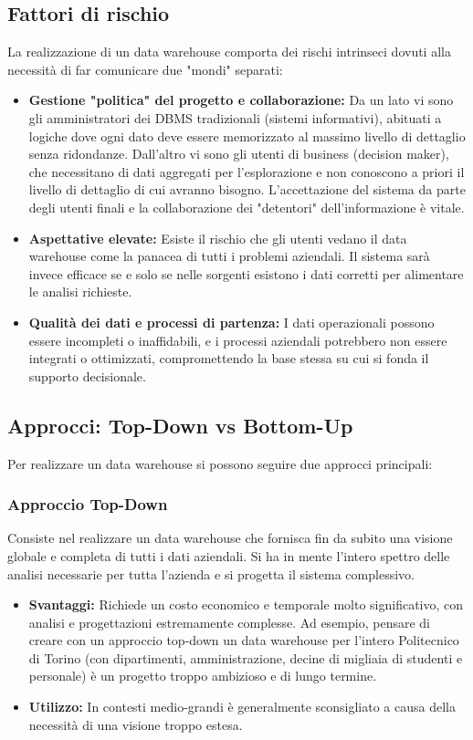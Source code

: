 \subsection{Fattori di rischio}
La realizzazione di un data warehouse comporta dei rischi intrinseci dovuti alla necessità di far comunicare due "mondi" separati:
\begin{itemize}
    \item \textbf{Gestione "politica" del progetto e collaborazione:} Da un lato vi sono gli amministratori dei DBMS tradizionali (sistemi informativi), abituati a logiche dove ogni dato deve essere memorizzato al massimo livello di dettaglio senza ridondanze. Dall'altro vi sono gli utenti di business (decision maker), che necessitano di dati aggregati per l'esplorazione e non conoscono a priori il livello di dettaglio di cui avranno bisogno. L'accettazione del sistema da parte degli utenti finali e la collaborazione dei "detentori" dell'informazione è vitale.
    \item \textbf{Aspettative elevate:} Esiste il rischio che gli utenti vedano il data warehouse come la panacea di tutti i problemi aziendali. Il sistema sarà invece efficace se e solo se nelle sorgenti esistono i dati corretti per alimentare le analisi richieste.
    \item \textbf{Qualità dei dati e processi di partenza:} I dati operazionali possono essere incompleti o inaffidabili, e i processi aziendali potrebbero non essere integrati o ottimizzati, compromettendo la base stessa su cui si fonda il supporto decisionale.
\end{itemize}

\subsection{Approcci: Top-Down vs Bottom-Up}
Per realizzare un data warehouse si possono seguire due approcci principali:

\subsubsection{Approccio Top-Down}
Consiste nel realizzare un data warehouse che fornisca fin da subito una visione globale e completa di tutti i dati aziendali. Si ha in mente l'intero spettro delle analisi necessarie per tutta l'azienda e si progetta il sistema complessivo.
\begin{itemize}
    \item \textbf{Svantaggi:} Richiede un costo economico e temporale molto significativo, con analisi e progettazioni estremamente complesse. Ad esempio, pensare di creare con un approccio top-down un data warehouse per l'intero Politecnico di Torino (con dipartimenti, amministrazione, decine di migliaia di studenti e personale) è un progetto troppo ambizioso e di lungo termine.
    \item \textbf{Utilizzo:} In contesti medio-grandi è generalmente sconsigliato a causa della necessità di una visione troppo estesa.
\end{itemize}

